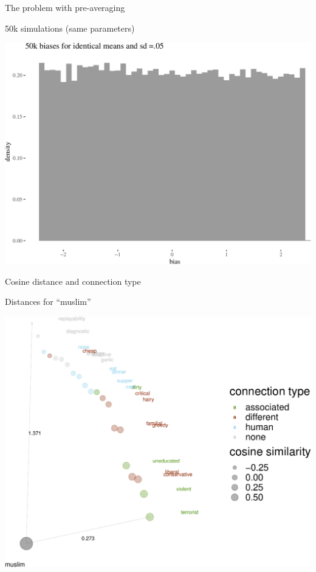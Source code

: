 \documentclass[10pt,ignorenonframetext,x11names, dvipsnames, bibspacing,natbib]{beamer}
\begin{document}
\begin{frame}{The problem with pre-averaging}

\begin{block}{50k simulations (same parameters)}

\vspace{1mm} \footnotesize

\begin{center}\includegraphics[width=0.8\linewidth]{presentationESSLLI_files/figure-beamer/unnamed-chunk-6-1} \end{center}

\normalsize

\end{block}

\end{frame}

\begin{frame}{Cosine distance and connection type}

\begin{block}{Distances for ``muslim''}

\begin{center}\includegraphics[width=0.8\linewidth]{presentationESSLLI_files/figure-beamer/unnamed-chunk-7-1} \end{center}

\end{block}

\end{frame}
\end{document}
